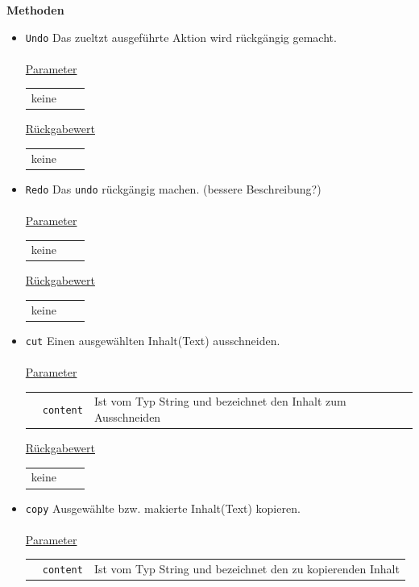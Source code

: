 \documentclass{article}
\begin{document}
\textbf{{Methoden}}
\begin{itemize}
\item \texttt{Undo} \newline Das zueltzt ausgeführte Aktion wird rückgängig gemacht.
\\\\

\underline{{Parameter}} 
\begin{tabular}{lll}
 keine
\end{tabular}

\underline{{Rückgabewert}}
\begin{tabular}{lll}
 keine
\end{tabular}

\item \texttt{Redo} \newline Das \texttt{undo} rückgängig machen. (bessere Beschreibung?)
\\\\

\underline{{Parameter}} 
\begin{tabular}{lll}
 keine
\end{tabular}

\underline{{Rückgabewert}}
\begin{tabular}{lll}
keine
\end{tabular}

\item \texttt{cut} \newline Einen ausgewählten Inhalt(Text) ausschneiden.
\\\\

\underline{{Parameter}} 
\begin{tabular}{lll}
 & \texttt{content} & Ist vom Typ String und bezeichnet den Inhalt zum Ausschneiden\\
\end{tabular}

\underline{{Rückgabewert}}
\begin{tabular}{lll}
keine
\end{tabular}

\item \texttt{copy} \newline Ausgewählte bzw. makierte Inhalt(Text) kopieren.
\\\\

\underline{{Parameter}} 
\begin{tabular}{lll}
& \texttt{content} & Ist vom Typ String und bezeichnet den zu kopierenden Inhalt \\
\end{tabular}


\end{itemize}
\end{document}
